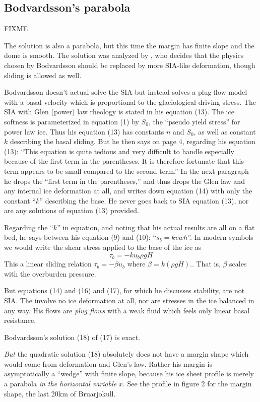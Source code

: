 \documentclass[twocolumn,letterpaper]{igs}
\begin{document}
\subsection*{Bodvardsson's parabola}

FIXME

The \cite{Bodvardsson} solution is also a parabola, but this time the margin has finite slope and the dome is smooth.  The \cite{Bodvardsson} solution was analyzed by \cite{Weertman61stability}, who decides that the physics chosen by Bodvardsson should be replaced by more SIA-like deformation, though sliding is allowed as well.

Bodvardsson doesn't actual solve the SIA but instead solves a plug-flow model with a basal velocity which is proportional to the glaciological driving stress.  The SIA with Glen (power) law rheology is stated in his equation (13).  The ice softness is parameterized in equation (1) by $S_0$, the ``pseudo yield stress'' for power law ice.  Thus his equation (13) has constants $n$ and $S_0$, as well as constant $k$ describing the basal sliding.  But he then says on page 4, regarding his equation (13): ``This equation is quite tedious and very difficult to handle especially because of the first term in the parentheses.  It is therefore fortunate that this term appears to be small compared to the second term.''  In the next paragraph he drops the ``first term in the parentheses,'' and thus drops the Glen law and any internal ice deformation at all, and writes down equation (14) with only the constant ``$k$'' describing the base.  He never goes back to SIA equation (13), nor are any solutions of equation (13) provided.

Regarding the ``$k$'' in equation, and noting that his actual results are all on a flat bed, he says between his equation (9) and (10): ``$s_b = k v w h$''.  In modern symbols we would write the shear stress applied to the base of the ice as
  $$\tau_b = - k u_b \rho g H$$
This a linear sliding relation $\tau_b = - \beta u_b$ where $\beta = k (\rho g H).$.  That is, $\beta$ scales with the overburden pressure.

But equations (14) and (16) and (17), for which he discusses stability, are not SIA.  The involve no ice deformation at all, nor are stresses in the ice balanced in any way.  His flows are \emph{plug flows} with a weak fluid which feels only linear basal resistance.

Bodvardsson's solution (18) of (17) is exact.

\emph{But} the quadratic solution (18) absolutely does not have a margin
shape which would come from deformation and Glen's law.  Rather his
margin is asymptotically a ``wedge'' with finite slope, because his ice
sheet profile is merely a parabola \emph{in the horizontal variable} $x$.
See the profile in figure 2 for the margin shape, the last 20km of
Bruarjokull.
\end{document}
